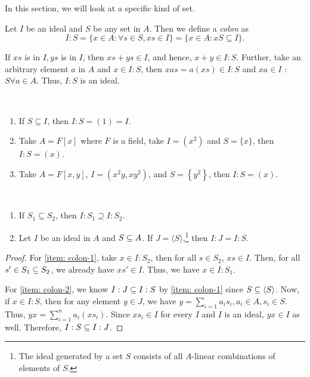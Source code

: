 In this section, we will look at a specific kind of set.
\begin{definition}[Colon]
Let $I$ be an ideal and $S$ be any set in $A$. Then we define a {\it colon} as
\[
I: S=\{x \in A\colon \forall s \in S, x s \in I\} = \{x \in A\colon x S \subseteq I\}.
\]
\end{definition}
\begin{note}
    If $x s$ is in $I, y s$ is in $I$, then $xs + ys \in I$, and hence, $x+y \in I:S$. Further, take an arbitrary element $a$ in $A$ and $x \in I:S$, then $x a s =  a (x s) \in I: S$ and $x a \in I$ : $S \forall a \in A$. Thus, $I:S$ is an ideal.
\end{note}
\begin{example}\ 
\begin{enumerate}
    \item If $S \subseteq I$, then $I: S=(1) = I$. 
    \item Take $A=F[x]$ where $F$ is a field, take $I=\left(x^{2}\right)$ and $S=\{x\}$, then $I:S = (x)$.
    \item Take $A=F[x, y]$, $I= \left(x^{2} y, x y^{2}\right)$, and $S=\left\{y^{2}\right\}$, then $I:S=(x)$.
\end{enumerate}
\end{example}
\begin{proposition}\label{prop: contain-colon}\ 
    \begin{enumerate}
        \item \label{item: colon-1} If $S_{1} \subseteq S_{2}$, then $I: S_{1} \supseteq I: S_{2}$. 
        \item \label{item: colon-2} Let $I$ be an ideal in $A$ and $S \ss A$. If  $J=\langle S\rangle$,\footnote{The ideal generated by a set $S$ consists of all $A$-linear combinations of elements of $S$.} then $I:J = I:S$.
    \end{enumerate}
\end{proposition}
\begin{proof}
    For \eqref{item: colon-1}, take $x \in I:S_2$, then for all $s \in S_2$, $xs \in I$. Then, for all $s' \in S_1 \ss S_2$, we already have $xs' \in I$. Thus, we have $x \in I:S_1$.

    For \eqref{item: colon-2}, we know $I: J \ss I: S$ by \eqref{item: colon-1} since $S \ss \angles{S}$. Now, if $x \in I:S$, then for any element $y \in J$, we have $y = \sum_{i=1} a_{i} s_{i}, a_{i} \in A, s_{i} \in S$. Thus, $y x = \sum_{i=1}^{n} a_{i} (x s_{i})$. Since $xs_i \in I$ for every $I$ and $I$ is an ideal, $yx \in I$ as well. Therefore, $I:S \ss I:J$.
\end{proof}

